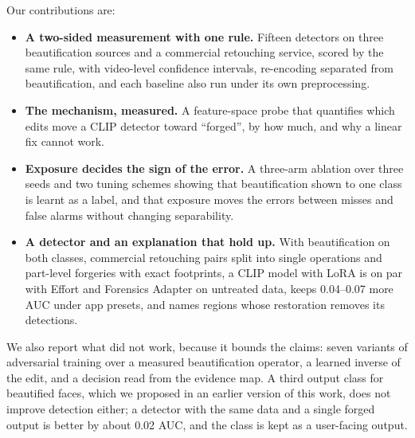 \documentclass[conference]{IEEEtran}
\begin{document}
Our contributions are:
\begin{itemize}
\item \textbf{A two-sided measurement with one rule.} Fifteen detectors on three beautification sources and a commercial
retouching service, scored by the same rule, with video-level confidence intervals, re-encoding separated from
beautification, and each baseline also run under its own preprocessing.
\item \textbf{The mechanism, measured.} A feature-space probe that quantifies which edits move a CLIP detector toward
``forged'', by how much, and why a linear fix cannot work.
\item \textbf{Exposure decides the sign of the error.} A three-arm ablation over three seeds and two tuning schemes
showing that beautification shown to one class is learnt as a label, and that exposure moves the errors between misses and false alarms without changing separability.
\item \textbf{A detector and an explanation that hold up.} With beautification on both classes, commercial retouching
pairs split into single operations and part-level forgeries with exact footprints, a CLIP model with LoRA is on par with
Effort and Forensics Adapter on untreated data, keeps 0.04--0.07 more AUC under app presets, and names regions whose
restoration removes its detections.
\end{itemize}
We also report what did not work, because it bounds the claims: seven variants of adversarial training over a measured
beautification operator, a learned inverse of the edit, and a decision read from the evidence map. A third output class
for beautified faces, which we proposed in an earlier version of this work, does not improve detection either; a detector
with the same data and a single forged output is better by about 0.02 AUC, and the class is kept as a user-facing output.

\end{document}
